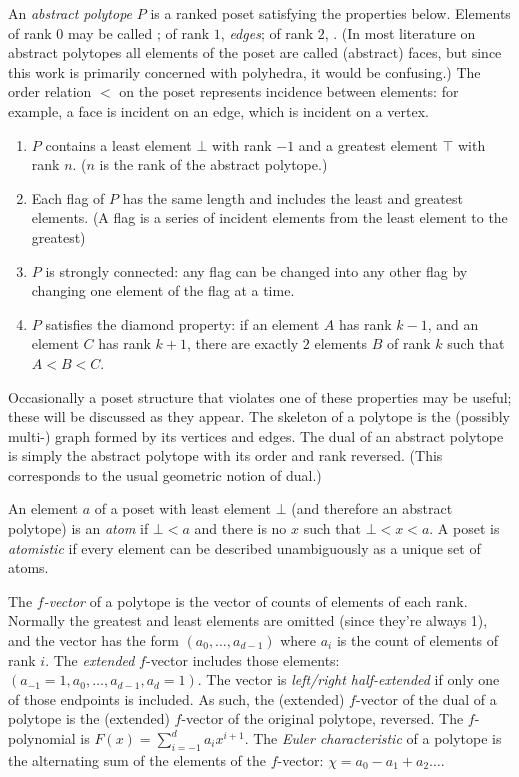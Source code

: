 \documentclass[12pt]{amsart}%
\begin{document}
An \textit{abstract polytope} $P$ is a ranked poset satisfying the properties
below. Elements of rank $0$ may be called ; of rank $1$,
\textit{edges}; of rank $2$, . (In most literature on abstract
polytopes all elements of the poset are called (abstract) faces, but since this
work is primarily concerned with polyhedra, it would be confusing.) The order
relation $<$ on the poset represents incidence between elements: for example,
a face is incident on an edge, which is incident on a vertex.\cite{mcmullen}
\begin{enumerate}
  \item $P$ contains a least element $\bot$ with rank $-1$ and a greatest
  element $\top$ with rank $n$. ($n$ is the rank of the abstract polytope.)
  \item Each flag of $P$ has the same length and includes the least and
  greatest elements. (A flag is a series of incident elements from the least
  element to the greatest)
  \item $P$ is strongly connected: any flag can be changed into any other flag
  by changing one element of the flag at a time.
  \item $P$ satisfies the diamond property: if an element $A$ has rank $k-1$,
  and an element $C$ has rank $k+1$, there are exactly $2$ elements $B$ of
  rank $k$ such that $A < B < C$.
\end{enumerate}
Occasionally a poset structure that violates one of these properties may be
useful; these will be discussed as they appear. The skeleton of a polytope is
the (possibly multi-) graph formed by its vertices and edges.
The dual of an abstract polytope is simply the abstract polytope with its order
and rank reversed. (This corresponds to the usual geometric notion of dual.)

An element $a$ of a poset with least element $\bot$ (and therefore an abstract
polytope) is an \textit{atom} if $\bot < a$ and there is no $x$ such that
$\bot < x < a$. A poset is \textit{atomistic} if every
element can be described unambiguously as a unique set of atoms.

The $f$\textit{-vector} of a polytope is the vector of counts of elements of
each rank. Normally the greatest and least elements are omitted (since they're
always 1), and the vector has the form $(a_0, \ldots, a_{d-1})$ where $a_i$ is
the count of elements of rank $i$. The \textit{extended} $f$-vector includes
those elements: $(a_{-1}=1, a_0, \ldots, a_{d-1}, a_d=1)$. The vector is
\textit{left/right half-extended} if only one of those endpoints is included.
As such, the (extended) $f$-vector of the dual of a polytope is the (extended)
$f$-vector of the original polytope, reversed. The $f$-polynomial is
$F(x) = \sum_{i=-1}^d a_i x^{i+1}$. The \textit{Euler characteristic} of a
polytope is the alternating sum of the elements of the $f$-vector:
$\chi = a_0 - a_1 + a_2 \ldots$.
\end{document}
